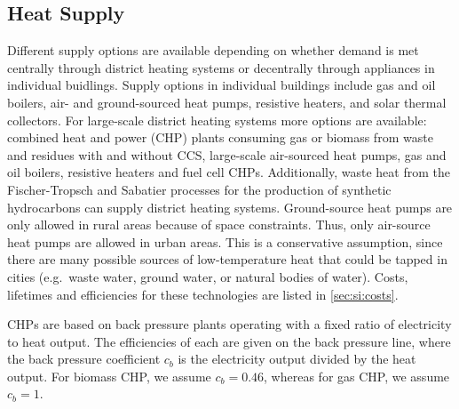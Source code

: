 
\subsection{Heat Supply}
\label{sec:si:heat:supply}

Different supply options are available depending on whether demand is met
centrally through district heating systems or decentrally through appliances in
individual buidlings. Supply options in individual buildings include gas and oil
boilers, air- and ground-sourced heat pumps, resistive heaters, and solar
thermal collectors. For large-scale district heating systems more options are
available: combined heat and power (CHP) plants consuming gas or biomass from
waste and residues with and without CCS, large-scale air-sourced
heat pumps, gas and oil boilers, resistive heaters and fuel cell CHPs.
Additionally, waste heat from the Fischer-Tropsch and Sabatier processes for the
production of synthetic hydrocarbons can supply district heating systems.
Ground-source heat pumps are only allowed in rural areas because of space constraints.
Thus, only air-source heat pumps are allowed in urban areas. This is a conservative
assumption, since there are many possible sources of low-temperature heat that
could be tapped in cities (e.g.~waste water, ground water, or natural bodies of water).
Costs, lifetimes and efficiencies for these technologies are listed in \cref{sec:si:costs}.


CHPs are based on back pressure plants operating with a fixed ratio of
electricity to heat output. The efficiencies of each are given on the back
pressure line, where the back pressure coefficient $c_b$ is the electricity
output divided by the heat output. For biomass CHP, we assume $c_b=0.46$,
whereas for gas CHP, we assume $c_b=1$.



